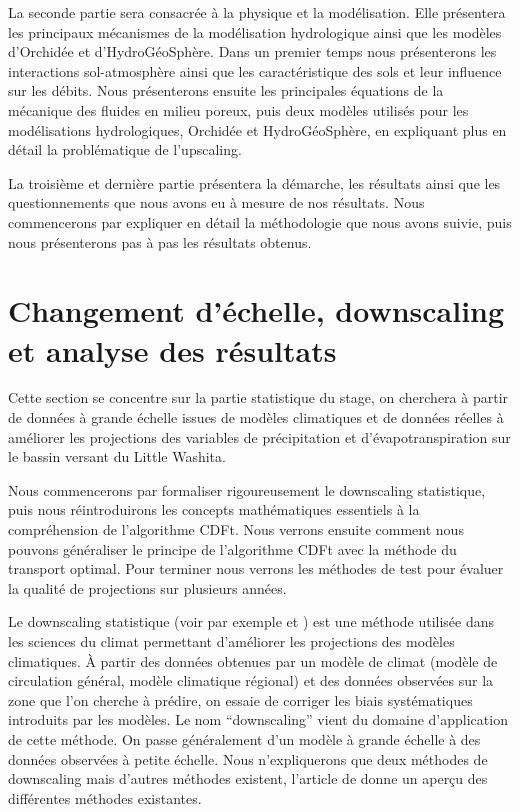 \documentclass[a4paper,11pt]{article}
\numberwithin{equation}{section}
\begin{document}
La seconde partie sera consacrée à la physique et la modélisation. Elle présentera les principaux mécanismes de la modélisation hydrologique ainsi que les modèles d'Orchidée et d'HydroGéoSphère. Dans un premier temps nous présenterons les interactions sol-atmosphère ainsi que les caractéristique des sols et leur influence sur les débits. Nous présenterons ensuite les principales équations de la mécanique des fluides en milieu poreux, puis deux modèles utilisés pour les modélisations hydrologiques, Orchidée et HydroGéoSphère, en expliquant plus en détail la problématique de l'upscaling.

La troisième et dernière partie présentera la démarche, les résultats ainsi que les questionnements que nous avons eu à mesure de nos résultats. Nous commencerons par expliquer en détail la méthodologie que nous avons suivie, puis nous présenterons pas à pas les résultats obtenus.


\newpage
\section{Changement d'échelle, downscaling et analyse des résultats}
\label{ch:downscaling}
Cette section se concentre sur la partie statistique du stage, on cherchera à partir de données à grande échelle issues de modèles climatiques et de données réelles à améliorer les projections des variables de précipitation et d'évapotranspiration sur le bassin versant du Little Washita. 

Nous commencerons par formaliser rigoureusement le downscaling statistique, puis nous réintroduirons les concepts mathématiques essentiels à la compréhension de l'algorithme CDFt. Nous verrons ensuite comment nous pouvons généraliser le principe de l'algorithme CDFt avec la méthode du transport optimal. Pour terminer nous verrons les méthodes de test pour évaluer la qualité de projections sur plusieurs années.

\vspace{0.7cm}

Le downscaling statistique (voir par exemple \cite{vrac2012dynamical} et \cite{ayar2016intercomparison}) est une méthode utilisée dans les sciences du climat permettant d'améliorer les projections des modèles climatiques. À partir des données obtenues par un modèle de climat (modèle de circulation général, modèle climatique régional) et des données observées sur la zone que l'on cherche à prédire, on essaie de corriger les biais systématiques introduits par les modèles. Le nom ``downscaling'' vient du domaine d'application de cette méthode. On passe généralement d'un modèle à grande échelle à des données observées à petite échelle. Nous n'expliquerons que deux méthodes de downscaling mais d'autres méthodes existent, l'article de \cite{ayar2016intercomparison} donne un aperçu des différentes méthodes existantes.
\end{document}
